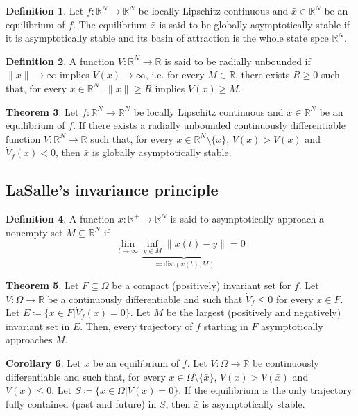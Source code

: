 \documentclass[12pt, openany]{report}
\theoremstyle{definition}
\newtheorem{thm}{Theorem}[chapter]
\newtheorem{definition}[thm]{Definition}
\newtheorem{crl}[thm]{Corollary}
\newcommand{\R}{\mathbb{R}}
\begin{document}
\begin{definition}
    Let \(f:\R^N\rightarrow \R^N\) be locally Lipschitz continuous and \(\bar x\in \R^N\) be an equilibrium of \(f\). The equilibrium \(\bar x\) is said to be globally asymptotically stable if it is asymptotically stable and its basin of attraction is the whole state spce \(\R^N\). 
\end{definition}
\begin{definition}
    A function \(V:\R^N\rightarrow \R\) is said to be radially unbounded if \(\lVert x\rVert \rightarrow \infty\) implies \(V(x)\rightarrow \infty\), i.e. for every \(M\in\R\), there exists \(R\ge 0\) such that, for every \(x\in \R^N\), \(\lVert x\rVert \ge R\) implies \(V(x)\ge M\). 
\end{definition}
\begin{thm}
    Let \(f:\R^N\rightarrow \R^N\) be locally Lipschitz continuous and \(\bar x\in \R^N\) be an equilibrium of \(f\). If there exists a radially unbounded continuously differentiable function \(V:\R^N\rightarrow \R\) such that, for every \(x\in \R^N\setminus \{\bar x\}\), \(V(x)>V(\bar x)\) and \(\dot V_f(x)<0\), then \(\bar x\) is globally asymptotically stable.
\end{thm}
\subsection{LaSalle's invariance principle}
\begin{definition}
    A function \(x:\R^+\rightarrow\R^N\) is said to asymptotically approach a nonempty set \(M\subseteq \R^N\) if 
    \begin{equation}
        \lim_{t\rightarrow \infty} \underbrace{\inf_{y\in M} \lVert x(t)-y\rVert}_{\eqcolon \text{dist}(x(t),M)} = 0
    \end{equation}
\end{definition}
\begin{thm}
    Let \(F\subseteq \Omega\) be a compact (positively) invariant set for \(f\). Let \(V:\Omega \rightarrow \R\) be a continuously differentiable and such that \(\dot V_f \le 0\) for every \(x\in F\). Let \(E\coloneqq \{x\in F|\dot V_f (x)=0\}\). Let \(M\) be the largest (positively and negatively) invariant set in \(E\). Then, every trajectory of \(f\) starting in \(F\) asymptotically approaches \(M\). 
\end{thm}
\begin{crl}
    Let \(\bar x\) be an equilibrium of \(f\). Let \(V:\Omega\rightarrow \R\) be continuously differentiable and such that, for every \(x\in \Omega\setminus \{\bar x\}\), \(V(x)>V(\bar x)\) and \(\dot V(x)\le 0\). Let \(S\coloneqq \{x\in \Omega |\dot V(x)=0\}\). If the equilibrium is the only trajectory fully contained (past and future) in \(S\), then \(\bar x\) is asymptotically stable. 
\end{crl}
\end{document}
